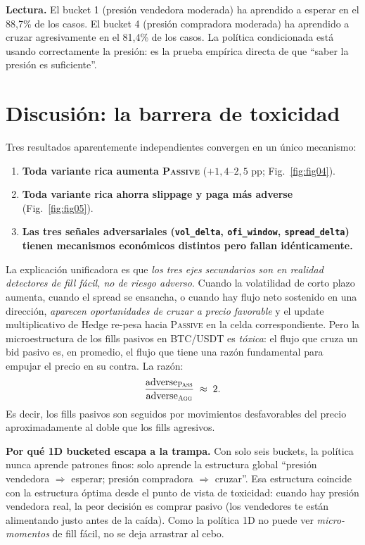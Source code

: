 \documentclass[journal,onecolumn,11pt]{IEEEtran}
\begin{document}
\textbf{Lectura.} El bucket 1 (presión vendedora moderada) ha
aprendido a esperar en el 88{,}7\% de los casos. El bucket 4
(presión compradora moderada) ha aprendido a cruzar agresivamente en
el 81{,}4\% de los casos. La política condicionada está usando
correctamente la presión: es la prueba empírica directa de que
``saber la presión es suficiente''.

\section{Discusión: la barrera de toxicidad}\label{sec:discusion}

Tres resultados aparentemente independientes convergen en un único
mecanismo:

\begin{enumerate}
\item \textbf{Toda variante rica aumenta \textsc{Passive}}
      ($+1{,}4$--$2{,}5$ pp; Fig.~\ref{fig:fig04}).
\item \textbf{Toda variante rica ahorra slippage y paga más adverse}
      (Fig.~\ref{fig:fig05}).
\item \textbf{Las tres señales adversariales (\texttt{vol\_delta},
      \texttt{ofi\_window}, \texttt{spread\_delta}) tienen mecanismos
      económicos distintos pero fallan idénticamente.}
\end{enumerate}

\noindent
La explicación unificadora es que \emph{los tres ejes secundarios son
en realidad detectores de fill fácil, no de riesgo adverso}.
Cuando la volatilidad de corto plazo aumenta, cuando el spread se
ensancha, o cuando hay flujo neto sostenido en una dirección,
\emph{aparecen oportunidades de cruzar a precio favorable} y el
update multiplicativo de Hedge re-pesa hacia \textsc{Passive} en la
celda correspondiente. Pero la microestructura de los fills pasivos
en BTC/USDT es \emph{tóxica}: el flujo que cruza un bid pasivo es,
en promedio, el flujo que tiene una razón fundamental para empujar el
precio en su contra. La razón:
\[
\frac{\text{adverse}_{\textsc{Pass}}}{\text{adverse}_{\textsc{Agg}}} \;\approx\; 2.
\]
Es decir, los fills pasivos son seguidos por movimientos
desfavorables del precio aproximadamente al doble que los fills
agresivos.

\medskip

\noindent
\textbf{Por qué 1D bucketed escapa a la trampa.} Con solo seis
buckets, la política nunca aprende patrones finos: solo aprende la
estructura global ``presión vendedora $\Rightarrow$ esperar; presión
compradora $\Rightarrow$ cruzar''. Esa estructura coincide con la
estructura óptima desde el punto de vista de toxicidad: cuando hay
presión vendedora real, la peor decisión es comprar pasivo (los
vendedores te están alimentando justo antes de la caída). Como la
política 1D no puede ver \emph{micro-momentos} de fill fácil, no se
deja arrastrar al cebo.
\end{document}
